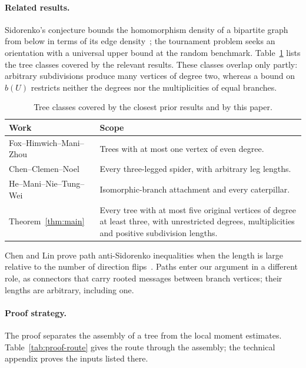 \paragraph{Related results.}
Sidorenko's conjecture bounds the homomorphism density of a bipartite
graph from below in terms of its edge density~\cite{Sidorenko}; the
tournament problem seeks an orientation with a universal upper bound
at the random benchmark. Table~\ref{tab:prior} lists the tree classes covered by the
relevant results. These classes overlap only partly: arbitrary
subdivisions produce many vertices of degree two, whereas a bound on
$b(U)$ restricts neither the degrees nor the multiplicities of equal
branches.

\begin{table}[htbp]\centering\small
\caption{Tree classes covered by the closest prior results and by this paper.}\label{tab:prior}
\begin{tabular}{@{}p{45mm}p{103mm}@{}}\toprule
Work & Scope\\\midrule
Fox--Himwich--Mani--Zhou~\cite[Proposition 1.13]{FHMZ} & Trees with at most one vertex of even degree.\\
Chen--Clemen--Noel~\cite{CCN} & Every three-legged spider, with arbitrary leg lengths.\\
He--Mani--Nie--Tung--Wei~\cite[Theorems 1.3 and 1.4]{HMNTW} & Isomorphic-branch attachment and every caterpillar.\\
Theorem~\ref{thm:main} & Every tree with at most five original vertices of degree at least three, with unrestricted degrees, multiplicities and positive subdivision lengths.\\\bottomrule
\end{tabular}
\end{table}
Chen and Lin prove path anti-Sidorenko inequalities when the length is
large relative to the number of direction flips~\cite{CL}. Paths enter
our argument in a different role, as connectors that carry rooted
messages between branch vertices; their lengths are arbitrary, including
one.

\paragraph{Proof strategy.}
The proof separates the assembly of a tree from the local moment
estimates. Table~\ref{tab:proof-route} gives the route through the
assembly; the technical appendix proves the inputs listed there.

